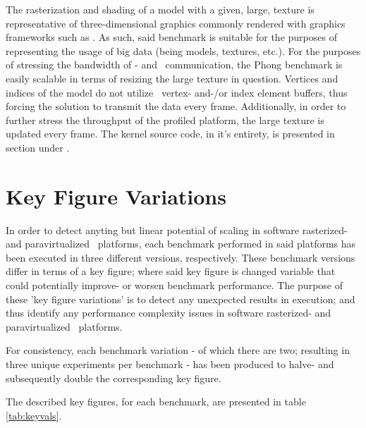 The rasterization and shading of a model with a given, large, texture is representative of three-dimensional graphics commonly rendered with graphics frameworks such as \dvttermopenglestwopointo .
As such, said benchmark is suitable for the purposes of representing the usage of big data (being models, textures, etc.).
For the purposes of stressing the bandwidth of \dvttermtarget - and \dvttermhost\ communication, the Phong benchmark is easily scalable in terms of resizing the large texture in question.
Vertices and indices of the model do not utilize \dvttermopengl\ vertex- and-/or index element buffers, thus forcing the solution to transmit the data every frame.
Additionally, in order to further stress the throughput of the profiled platform, the large texture is updated every frame.
The kernel source code, in it's entirety, is presented in section  under .

\section{Key Figure Variations}
\label{sec:methodologyexperiment_keyfigurevariations}
In order to detect anyting but linear potential of scaling in software rasterized- and paravirtualized \dvttermsimics\ platforms, each benchmark performed in said platforms has been executed in three different versions, respectively.
These benchmark versions differ in terms of a key figure; where said key figure is changed variable that could potentially improve- or worsen benchmark performance.
The purpose of these 'key figure variations' is to detect any unexpected results in execution; and thus identify any performance complexity issues in software rasterized- and paravirtualized \dvttermsimics\ platforms.

For consistency, each benchmark variation - of which there are two; resulting in three unique experiments per benchmark - has been produced to halve- and subsequently double the corresponding key figure.

\noindent
The described key figures, for each benchmark, are presented in table \ref{tab:keyvals}.


